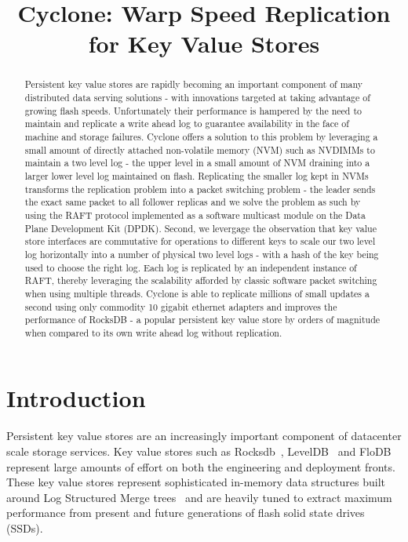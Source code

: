 \documentclass[10pt, preprint, nonatbib]{sigplanconf}
\date{}
\begin{document}
\title{\Large \bf Cyclone: Warp Speed Replication for Key Value Stores}

\maketitle


\begin{abstract}
Persistent key value stores are rapidly becoming an important component of many
distributed data serving solutions - with innovations targeted at taking
advantage of growing flash speeds. Unfortunately their performance is hampered
by the need to maintain and replicate a write ahead log to guarantee
availability in the face of machine and storage failures. Cyclone offers a
solution to this problem by leveraging a small amount of directly attached
non-volatile memory (NVM) such as NVDIMMs to maintain a two level log - the upper
level in a small amount of NVM draining into a larger lower level log
maintained on flash. Replicating the smaller log kept in NVMs transforms the
replication problem into a packet switching problem - the leader sends the exact
same packet to all follower replicas and we solve the problem as such by using
the RAFT protocol implemented as a software multicast module on the Data Plane
Development Kit (DPDK). Second, we levergage the observation that key value store
interfaces are commutative for operations to different keys to scale our two
level log horizontally into a number of physical two level logs - with a hash of
the key being used to choose the right log. Each log is replicated by an
independent instance of RAFT, thereby leveraging the scalability afforded by
classic software packet switching when using multiple threads. Cyclone is able
to replicate millions of small updates a second using only commodity 10 gigabit
ethernet adapters and improves the performance of RocksDB - a popular persistent
key value store by orders of magnitude when compared to its own write ahead log
without replication.
\end{abstract}

\section{Introduction}
Persistent key value stores are an increasingly important component of
datacenter scale storage services. Key value stores such as
Rocksdb~\cite{rocksdb}, LevelDB~\cite{leveldb} and FloDB~\cite{flodb} represent
large amounts of effort on both the engineering and deployment fronts. These key
value stores represent sophisticated in-memory data structures built around Log
Structured Merge trees~\cite{lsmtree} and are heavily tuned to extract maximum
performance from present and future generations of flash solid state drives
(SSDs).
\end{document}
